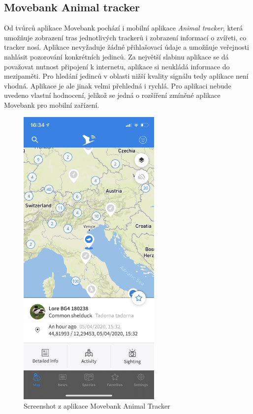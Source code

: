 \subsection{Movebank Animal tracker}

Od tvůrců aplikace Movebank pochází i mobilní aplikace \emph{Animal tracker}, která umožňuje zobrazení tras jednotlivých trackerů i zobrazení informací o zvířeti, co tracker nosí. Aplikace nevyžaduje žádné přihlašovací údaje a umožňuje veřejnosti nahlásit pozorování konkrétních jedinců. Za největší slabinu aplikace se dá považovat nutnost připojení k internetu, aplikace si neukládá informace do mezipaměti. Pro hledání jedinců v oblasti nižší kvality signálu tedy aplikace není vhodná. Aplikace je ale jinak velmi přehledná i rychlá. Pro aplikaci nebude uvedeno vlastní hodnocení, jelikož se jedná o rozšíření zmíněné aplikace Movebank pro mobilní zařízení.

\begin{figure}[H]
	\begin{center}
		\includegraphics[width=70mm]{img/animaltracker_app_movebank.png}
	\end{center}
	\caption{Screenshot z aplikace Movebank Animal Tracker}
	\label{fig:movebank}
\end{figure}

